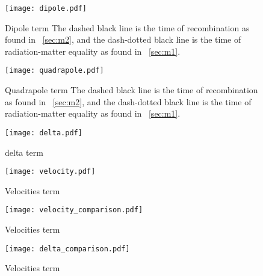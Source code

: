     \begin{figure}
        \texttt{[image: dipole.pdf]}
        \caption{Dipole term The dashed black line is the time of recombination as found in ~\cref{sec:m2}, and the dash-dotted black line is the time of radiation-matter equality as found in ~\cref{sec:m1}.}
        \label{fig:m3:dipole}
    \end{figure}

    \begin{figure}
        \texttt{[image: quadrapole.pdf]}
        \caption{Quadrapole term The dashed black line is the time of recombination as found in ~\cref{sec:m2}, and the dash-dotted black line is the time of radiation-matter equality as found in ~\cref{sec:m1}.}
        \label{fig:m3:quadrapole}
    \end{figure}

    \begin{figure}
        \texttt{[image: delta.pdf]}
        \caption{delta term}
        \label{fig:m3:delta}
    \end{figure}

    \begin{figure}
        \texttt{[image: velocity.pdf]}
        \caption{Velocities term}
        \label{fig:m3:velocity}
    \end{figure}

    \begin{figure}
        \texttt{[image: velocity\_comparison.pdf]}
        \caption{Velocities term}
        \label{fig:m3:velocity_comparison}
    \end{figure}

    \begin{figure}
        \texttt{[image: delta\_comparison.pdf]}
        \caption{Velocities term}
        \label{fig:m3:delta_comparison}
    \end{figure}


